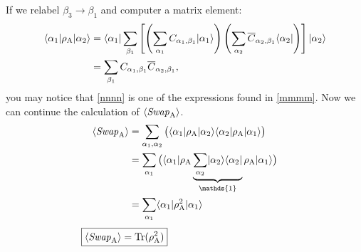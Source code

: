 If we relabel $\beta_3 \rightarrow \beta_1$ and computer a matrix element:
\begin{align}
	\langle {\alpha_1} \rvert\rho_{\rm A} \lvert {\alpha_2} \rangle
	&=   \langle {\alpha_1} \rvert\sum_{\beta_1}  \left[ \left(\sum_{\alpha_1} 
		C_{\alpha_1,\beta_1}\lvert {\alpha_1} \rangle\right)
		\left(\sum_{\alpha_2} 
		\overline{C}_{\alpha_2,\beta_1}\langle {\alpha_2} \rvert\right) \right] \lvert {\alpha_2} \rangle \\
	&= \sum_{\beta_1} C_{\alpha_1,\beta_1} \overline{C}_{\alpha_2,\beta_1} \label{nnnn},
\end{align}
you may notice that \eqref{nnnn} is one of the expressions found in \eqref{mmmm}.
Now we can continue the calculation of $\langle {\it Swap}_{\rm A} \rangle$.
\begin{align}
\langle \SWA \rangle &= \sum_{\alpha_1,\alpha_2} \big( \bra{\alpha_1}\rho_{\rm A} \ket{\alpha_2} 
					\bra{\alpha_2}\rho_{\rm A} \ket{\alpha_1}\big) \\
	&= \sum_{\alpha_1} \big( \bra{\alpha_1}\rho_{\rm A} 
				\underbrace{\sum_{\alpha_2} \ket{\alpha_2}\bra{\alpha_2}}_{\mathds{1}}
				\rho_{\rm A} \ket{\alpha_1}\big) \\
	&= \sum_{\alpha_1} \bra{\alpha_1}\rho_{\rm A}^2  \ket{\alpha_1}
\end{align}
\vspace{-5mm}
\begin{align}
	\hspace{-3.3cm}\boxed{\langle \SWA \rangle= {\rm Tr (\rho_A^2)}} \hspace{1cm}
\end{align}

